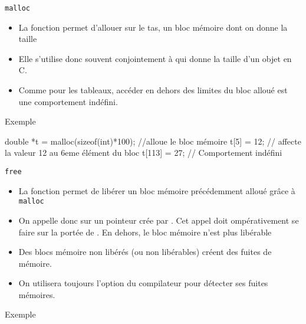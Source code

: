 \documentclass[10pt]{beamer}
\begin{document}
\begin{frame}[fragile]{\Ctitle}{\stitle}
	\begin{alertblock}{{\tt malloc}}
		\begin{itemize}
			\item<1-> La fonction  permet d'allouer sur le tas, un bloc mémoire dont on donne la taille
			\item<2-> Elle s'utilise donc souvent conjointement à  qui donne la taille d'un objet en C.
			\item<3-> Comme pour les tableaux, accéder en dehors des limites du bloc alloué est une comportement indéfini.
		\end{itemize}
	\end{alertblock}
	\begin{exampleblock}{Exemple}
			\onslide<4->
				\begin{langageC}
double *t =  malloc(sizeof(int)*100); //alloue le bloc mémoire
t[5] = 12; // affecte la valeur 12 au 6eme élément du bloc
t[113] = 27; // Comportement indéfini
				\end{langageC}
	\end{exampleblock}
\end{frame}

\begin{frame}[fragile]{\Ctitle}{\stitle}
	\begin{alertblock}{{\tt free}}
		\begin{itemize}
			\item<1-> La fonction  permet de libérer un bloc mémoire précédemment alloué grâce à {\tt malloc}
			\item<2-> On appelle donc  sur un pointeur crée  par . Cet appel doit ompérativement se faire sur la portée de . En dehors, le bloc mémoire n'est plus libérable
			\item<3-> Des blocs mémoire non libérés (ou non libérables) créent des fuites de mémoire.
			\item<4-> On utilisera toujours l'option  du compilateur pour détecter ses fuites mémoires.
		\end{itemize}
	\end{alertblock}
\end{frame}

\begin{frame}[fragile]{\Ctitle}{\stitle}
	\begin{exampleblock}{Exemple}
	\end{exampleblock}
\end{frame}
\end{document}
